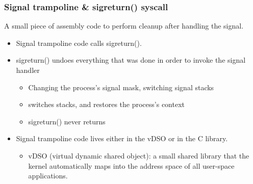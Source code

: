 % 
% 
% 
\begin{frame}[fragile]
    \frametitle{Signal trampoline \& sigreturn() syscall}
A small piece of assembly code to perform cleanup after handling the signal. \pause
    \begin{itemize}
        \item Signal trampoline code calls sigreturn(). \pause
        \item sigreturn() undoes everything that was done in order to invoke the signal handler
        \begin{itemize}
            \item Changing the process's signal mask, switching signal stacks
            \item switches stacks, and restores the process's context
            \item sigreturn() never returns
        \end{itemize} \pause
        \item Signal trampoline code lives either in the vDSO or in the C library.
        \begin{itemize}
            \item vDSO (virtual dynamic shared object): a small shared library that the kernel automatically maps into the address space of all user-space applications.
        \end{itemize}
    \end{itemize}
\end{frame}
% 
% 
